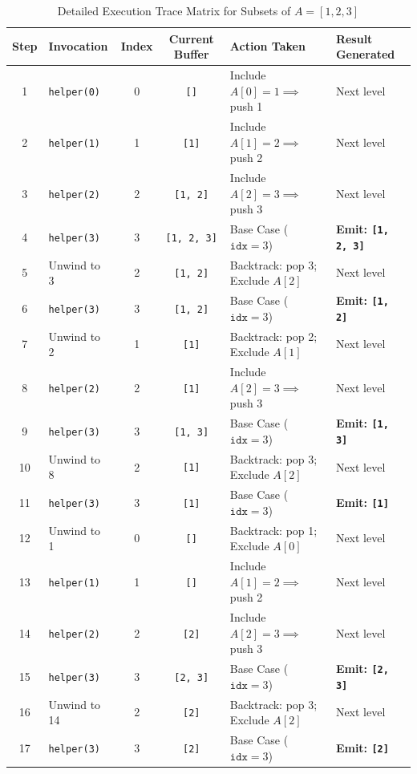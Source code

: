\documentclass[10pt,journal,compsoc,onecolumn]{IEEEtran}
\begin{document}
\begin{table}[htbp]
\centering
\caption{Detailed Execution Trace Matrix for Subsets of $A = [1, 2, 3]$}
\label{tab:subsets_trace}
\begin{tabular}{clccll}
\toprule
Step & Invocation & Index & Current Buffer & Action Taken & Result Generated \\
\midrule
1 & \texttt{helper(0)} & 0 & \texttt{[]} & Include $A[0]=1 \implies$ push 1 & Next level \\
2 & \texttt{helper(1)} & 1 & \texttt{[1]} & Include $A[1]=2 \implies$ push 2 & Next level \\
3 & \texttt{helper(2)} & 2 & \texttt{[1, 2]} & Include $A[2]=3 \implies$ push 3 & Next level \\
4 & \texttt{helper(3)} & 3 & \texttt{[1, 2, 3]} & Base Case ($\texttt{idx}=3$) & \textbf{Emit: \texttt{[1, 2, 3]}} \\
5 & Unwind to 3 & 2 & \texttt{[1, 2]} & Backtrack: pop 3; Exclude $A[2]$ & Next level \\
6 & \texttt{helper(3)} & 3 & \texttt{[1, 2]} & Base Case ($\texttt{idx}=3$) & \textbf{Emit: \texttt{[1, 2]}} \\
7 & Unwind to 2 & 1 & \texttt{[1]} & Backtrack: pop 2; Exclude $A[1]$ & Next level \\
8 & \texttt{helper(2)} & 2 & \texttt{[1]} & Include $A[2]=3 \implies$ push 3 & Next level \\
9 & \texttt{helper(3)} & 3 & \texttt{[1, 3]} & Base Case ($\texttt{idx}=3$) & \textbf{Emit: \texttt{[1, 3]}} \\
10 & Unwind to 8 & 2 & \texttt{[1]} & Backtrack: pop 3; Exclude $A[2]$ & Next level \\
11 & \texttt{helper(3)} & 3 & \texttt{[1]} & Base Case ($\texttt{idx}=3$) & \textbf{Emit: \texttt{[1]}} \\
12 & Unwind to 1 & 0 & \texttt{[]} & Backtrack: pop 1; Exclude $A[0]$ & Next level \\
13 & \texttt{helper(1)} & 1 & \texttt{[]} & Include $A[1]=2 \implies$ push 2 & Next level \\
14 & \texttt{helper(2)} & 2 & \texttt{[2]} & Include $A[2]=3 \implies$ push 3 & Next level \\
15 & \texttt{helper(3)} & 3 & \texttt{[2, 3]} & Base Case ($\texttt{idx}=3$) & \textbf{Emit: \texttt{[2, 3]}} \\
16 & Unwind to 14 & 2 & \texttt{[2]} & Backtrack: pop 3; Exclude $A[2]$ & Next level \\
17 & \texttt{helper(3)} & 3 & \texttt{[2]} & Base Case ($\texttt{idx}=3$) & \textbf{Emit: \texttt{[2]}} \\

\end{tabular}
\end{table}
\end{document}
